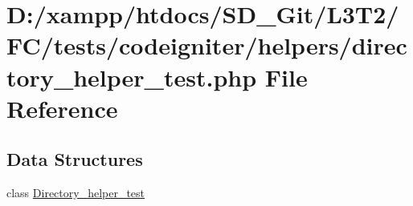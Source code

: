 \hypertarget{directory__helper__test_8php}{}\section{D\+:/xampp/htdocs/\+S\+D\+\_\+\+Git/\+L3\+T2/\+F\+C/tests/codeigniter/helpers/directory\+\_\+helper\+\_\+test.php File Reference}
\label{directory__helper__test_8php}
\subsection*{Data Structures}
\begin{DoxyCompactItemize}
\item 
class \hyperlink{class_directory__helper__test}{Directory\+\_\+helper\+\_\+test}
\end{DoxyCompactItemize}
